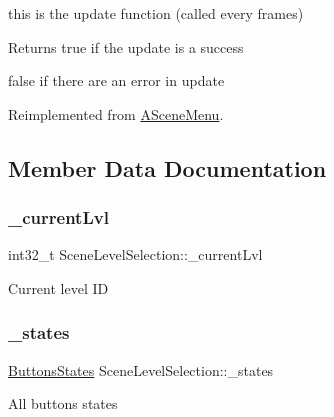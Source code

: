 this is the update function (called every frames) 

\begin{DoxyReturn}{Returns}
true if the update is a success 

false if there are an error in update 
\end{DoxyReturn}


Reimplemented from \hyperlink{class_a_scene_menu_a1deeb5fd9be97376998cd2af36f29744}{A\+Scene\+Menu}.



\subsection{Member Data Documentation}
\mbox{\label{class_scene_level_selection_afa1ff9c9029dd3226dbdc17c46b88081}} 
\subsubsection{\texorpdfstring{\+\_\+current\+Lvl}{\_currentLvl}}
{\footnotesize\ttfamily int32\+\_\+t Scene\+Level\+Selection\+::\+\_\+current\+Lvl\hspace{0.3cm}{\ttfamily [protected]}}

Current level ID \mbox{\label{class_scene_level_selection_a3e07eec156666992e39f5c5bef3bcd2a}} 
\subsubsection{\texorpdfstring{\+\_\+states}{\_states}}
{\footnotesize\ttfamily \hyperlink{struct_scene_level_selection_1_1_buttons_states}{Buttons\+States} Scene\+Level\+Selection\+::\+\_\+states\hspace{0.3cm}{\ttfamily [protected]}}

All buttons states \mbox{\label{class_scene_level_selection_a8933e75587039a89a300a7e68296db2d}} 

